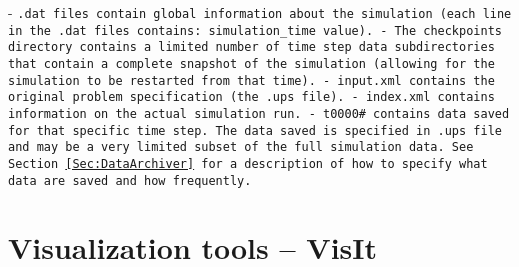 - \tt.dat \normalfont files contain global information about the simulation
(each line in the .dat files contains: simulation\_time value).
- The \tt checkpoints \normalfont directory contains a limited number of time
step data subdirectories that contain a complete snapshot of the
simulation (allowing for the simulation to be restarted from that
time).
- \tt input.xml \normalfont contains the original problem specification (the
.ups file).
- \tt index.xml \normalfont contains information on the actual simulation run.
- \tt t0000\# \normalfont contains data saved for that specific time step.  The
data saved is specified in .ups file and may be a very limited subset
of the full simulation data.  See Section~\ref{Sec:DataArchiver} for a
description of how to specify what data are saved and how frequently.









\chapter{Visualization tools -- VisIt}

